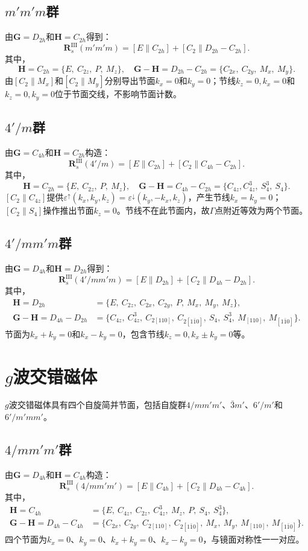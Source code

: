 \subsection*{$m'm'm$群}
由$\mathbf{G}=D_{2h}$和$\mathbf{H}=C_{2h}$得到：
\[
\mathbf{R}_s^{\mathrm{III}}(m'm'm) = [E\|C_{2h}] + [C_2\|D_{2h}-C_{2h}].
\]
其中，
\[
\mathbf{H}=C_{2h} = \{E,\ C_{2z},\ P,\ M_z\},\quad
\mathbf{G}-\mathbf{H}=D_{2h}-C_{2h} = \{C_{2x},\ C_{2y},\ M_x,\ M_y\}.
\]
由$[C_2\|M_x]$和$[C_2\|M_y]$分别导出节面$k_x=0$和$k_y=0$；节线$k_z=0,k_x=0$和$k_z=0,k_y=0$位于节面交线，不影响节面计数。

\subsection*{$4'/m$群}
由$\mathbf{G}=C_{4h}$和$\mathbf{H}=C_{2h}$构造：
\[
\mathbf{R}_s^{\mathrm{III}}(4'/m) = [E\|C_{2h}] + [C_2\|C_{4h}-C_{2h}].
\]
其中，
\[
\mathbf{H}=C_{2h} = \{E,\ C_{2z},\ P,\ M_z\},\quad
\mathbf{G}-\mathbf{H}=C_{4h}-C_{2h} = \{C_{4z},C_{4z}^3,\ S_4^3,\ S_4\}.
\]
$[C_2\|C_{4z}]$提供$\varepsilon^{\uparrow}(k_x,k_y,k_z)=\varepsilon^{\downarrow}(k_y,-k_x,k_z)$，产生节线$k_x=k_y=0$；
$[C_2\|S_4]$操作推出节面$k_z=0$。节线不在此节面内，故$\Gamma$点附近等效为两个节面。

\subsection*{$4'/mm'm$群}
由$\mathbf{G}=D_{4h}$和$\mathbf{H}=D_{2h}$得到：
\[
\mathbf{R}_s^{\mathrm{III}}(4'/mm'm) = [E\|D_{2h}] + [C_2\|D_{4h}-D_{2h}].
\]
其中，
\[
\begin{aligned}
\mathbf{H}=D_{2h} &= \{E,\ C_{2z},\ C_{2x},\ C_{2y},\ P,\ M_x,\ M_y,\ M_z\},\\
\mathbf{G}-\mathbf{H}=D_{4h}-D_{2h} &= \{C_{4z},\ C_{4z}^3,\ C_{2[110]},\ C_{2[1\bar10]},\ S_4,\ S_4^3,\ M_{[110]},\ M_{[1\bar10]}\}.
\end{aligned}
\]
节面为$k_x+k_y=0$和$k_x-k_y=0$，包含节线$k_z=0,k_x\pm k_y=0$等。

\section{$g$波交错磁体}\label{sec:g-wave}

$g$波交错磁体具有四个自旋简并节面，包括自旋群$4/mm'm'$、$\bar{3}m'$、$6'/m'$和$6'/m'mm'$。

\subsection*{$4/mm'm'$群}
由$\mathbf{G}=D_{4h}$和$\mathbf{H}=C_{4h}$构造：
\[
\mathbf{R}_s^{\mathrm{III}}(4/mm'm') = [E\|C_{4h}] + [C_2\|D_{4h}-C_{4h}].
\]
其中，
\[
\begin{aligned}
\mathbf{H} = C_{4h} &= \{ E,\ C_{4z},\ C_{2z},\ C_{4z}^3,\ M_z,\ P,\ S_4,\ S_4^3 \}, \\
\mathbf{G}-\mathbf{H}=D_{4h}-C_{4h} &= \{ C_{2x},\ C_{2y},\ C_{2[110]},\ C_{2[1\bar10]},\ M_x,\ M_y,\ M_{[110]},\ M_{[1\bar10]} \}.
\end{aligned}
\]
四个节面为$k_x=0$、$k_y=0$、$k_x+k_y=0$、$k_x-k_y=0$，与镜面对称性一一对应。

